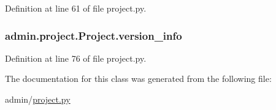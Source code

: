 Definition at line 61 of file project.\-py.

\hypertarget{classadmin_1_1project_1_1Project_aead4e47be18c6ddbfd19d3b5aab88bda}{
\subsubsection[{version\-\_\-info}]{\setlength{\rightskip}{0pt plus 5cm}admin.\-project.\-Project.\-version\-\_\-info}}\label{classadmin_1_1project_1_1Project_aead4e47be18c6ddbfd19d3b5aab88bda}


Definition at line 76 of file project.\-py.



The documentation for this class was generated from the following file\-:\begin{DoxyCompactItemize}
\item 
admin/\hyperlink{project_8py}{project.\-py}\end{DoxyCompactItemize}
